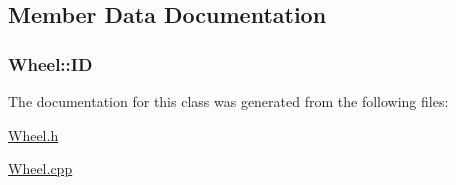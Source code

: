 \subsection{Member Data Documentation}
\hypertarget{classWheel_aea86817285acade58673eaa82782ce7a}{
\subsubsection[{I\-D}]{ Wheel\-::\-I\-D\hspace{0.3cm}{\ttfamily [private]}}}\label{classWheel_aea86817285acade58673eaa82782ce7a}


The documentation for this class was generated from the following files\-:\begin{DoxyCompactItemize}
\item 
\hyperlink{Wheel_8h}{Wheel.\-h}\item 
\hyperlink{Wheel_8cpp}{Wheel.\-cpp}\end{DoxyCompactItemize}
